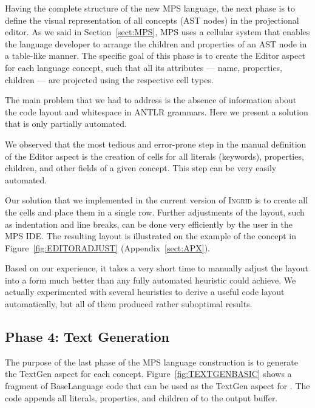 Having the complete structure of the new MPS language, the next phase is to define the visual representation of all concepts (AST nodes) in the projectional editor.
As we said in Section~\ref{sect:MPS}, MPS uses a cellular system that enables the language developer to arrange the children and properties of an AST node in a table-like manner.
The specific goal of this phase is to create the Editor aspect for each language concept, such that all its attributes --- name, properties, children --- are projected using the respective cell types.

The main problem that we had to address is the absence of information about the code layout and whitespace in ANTLR grammars.
Here we present a solution that is only partially automated.

We observed that the most tedious and error-prone step in the manual definition of the Editor aspect is the creation of cells for all literals (keywords), properties, children, and other fields of a given concept.
This step can be very easily automated.

Our solution that we implemented in the current version of \textsc{Ingrid} is to create all the cells and place them in a single row.
Further adjustments of the layout, such as indentation and line breaks, can be done very efficiently by the user in the MPS IDE.
The resulting layout is illustrated on the example of the  concept in Figure~\ref{fig:EDITORADJUST} (Appendix~\ref{sect:APX}).

Based on our experience, it takes a very short time to manually adjust the layout into a form much better than any fully automated heuristic could achieve.
We actually experimented with several heuristics to derive a useful code layout automatically, but all of them produced rather suboptimal results.

\subsection{Phase 4: Text Generation}
\label{sect:TEXTGENDEF}

The purpose of the last phase of the MPS language construction is to generate the TextGen aspect for each concept.
Figure~\ref{fig:TEXTGENBASIC} shows a fragment of BaseLanguage code that can be used as the TextGen aspect for .
The code appends all literals, properties, and children of  to the output buffer.

